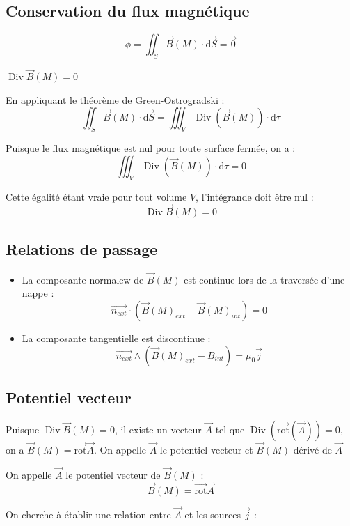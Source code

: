 \documentclass[french]{yLectureNote}
\renewcommand{\vec}{\overrightarrow}
\newcommand{\dd}{\mathrm{d}}
\newcommand{\B}{\vec{B}(M)}
\DeclareMathOperator{\Div}{Div}
\newcommand{\rot}{\vec{\mathrm{rot}}}
\begin{document}
\subsection{Conservation du flux magnétique}
\begin{theorem}

    $$\phi = \iint_S \B\cdot \vec{\dd S} = \vec{0}$$
\end{theorem}
\begin{theorem}
    $\Div \B = 0$
\end{theorem}
\begin{myproof}
    En appliquant le théorème de Green-Ostrogradski :
    $$\iint_S \B \cdot \vec{\dd S} = \iiint_V \Div(\B) \cdot \dd \tau$$
    
    Puisque le flux magnétique est nul pour toute surface fermée, on a :
    $$\iiint_V \Div(\B) \cdot \dd \tau = 0$$
    
    Cette égalité étant vraie pour tout volume $V$, l'intégrande doit être nul :
    $$\Div \B = 0$$
\end{myproof}
\subsection{Relations de passage} 
\begin{theorem}
    \begin{itemize}
    \item La composante normalew de $\B$ est continue lors de la traversée d'une nappe : $$ \vec{n_{ext}}\cdot (\B_{ext}-\B_{int})=0$$
    \item La composante tangentielle est discontinue : $$\vec{n_{ext}}\wedge (\B_{ext}-B_{int}) = \mu_0 \vec{j}$$
\end{itemize}
\end{theorem}
\subsection{Potentiel vecteur}
Puisque $\Div\B = 0$, il existe un vecteur $\vec{A}$ tel que $\Div(\rot(\vec{A}))=0$, on a $\B = \rot\vec{A}$. On appelle $\vec{A}$ le potentiel vecteur et $\B$ dérivé de $\vec{A}$
\begin{definition}
    On appelle $\vec{A}$ le potentiel vecteur de $\B$ : $$\B = \rot\vec{A}$$
\end{definition}
On cherche à établir une relation entre $\vec{A}$ et les sources $\vec{j}$ :
\end{document}
